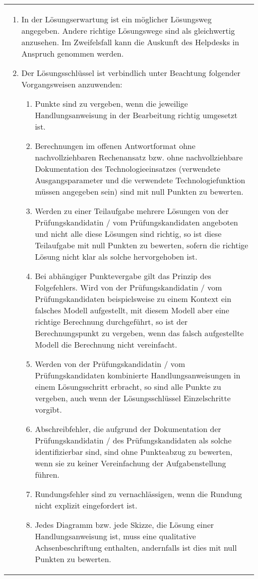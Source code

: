 \documentclass[10pt,a4paper]{article}
\makeatletter
\newcommand{\myEnumStartAt}{\@EnumStartAt}
\makeatother
\begin{document}
{\begin{tabular}{p{14cm}}
{\begin{enumerate}
\item In der Lösungserwartung ist ein möglicher Lösungsweg angegeben. Andere richtige Lösungswege sind als gleichwertig anzusehen. Im Zweifelsfall kann die Auskunft des Helpdesks in Anspruch genommen werden.
\item Der Lösungsschlüssel ist verbindlich unter Beachtung folgender Vorgangsweisen anzuwenden:
  \begin{enumerate}[label=\alph*)]
    \item Punkte sind zu vergeben, wenn die jeweilige Handlungsanweisung in der Bearbeitung richtig umgesetzt ist.
    \item Berechnungen im offenen Antwortformat ohne nachvollziehbaren Rechenansatz bzw. ohne nachvollziehbare Dokumentation des Technologieeinsatzes (verwendete Ausgangsparameter und die verwendete Technologiefunktion müssen angegeben sein) sind mit null Punkten zu bewerten.
    \item Werden zu einer Teilaufgabe mehrere Lösungen von der Prüfungskandidatin / vom Prüfungskandidaten angeboten und nicht alle diese Lösungen sind richtig, so ist diese Teilaufgabe mit null Punkten zu bewerten, sofern die richtige Lösung nicht klar als solche hervorgehoben ist.
    \item Bei abhängiger Punktevergabe gilt das Prinzip des Folgefehlers. Wird von der Prüfungskandidatin / vom Prüfungskandidaten beispielsweise zu einem Kontext ein falsches Modell aufgestellt, mit diesem Modell aber eine richtige Berechnung durchgeführt, so ist der Berechnungspunkt zu vergeben, wenn das falsch aufgestellte Modell die Berechnung nicht vereinfacht.
    \item Werden von der Prüfungskandidatin / vom Prüfungskandidaten kombinierte Handlungsanweisungen in einem Lösungsschritt erbracht, so sind alle Punkte zu vergeben, auch wenn der Lösungsschlüssel Einzelschritte vorgibt.
    \item Abschreibfehler, die aufgrund der Dokumentation der Prüfungskandidatin / des Prüfungskandidaten als solche identifizierbar sind, sind ohne Punkteabzug zu bewerten, wenn sie zu keiner Vereinfachung der Aufgabenstellung führen.
    \item Rundungsfehler sind zu vernachlässigen, wenn die Rundung nicht explizit eingefordert ist.
    \item Jedes Diagramm bzw. jede Skizze, die Lösung einer Handlungsanweisung ist, muss eine qualitative Achsenbeschriftung enthalten, andernfalls ist dies mit null Punkten zu bewerten.
  \end{enumerate}
\end{enumerate}

}

\end{tabular}

\vspace*{1cm}

}

\newpage

\begin{enumerate}
\setcounter{enumi}{\myEnumStartAt}


\end{enumerate}
\end{document}
